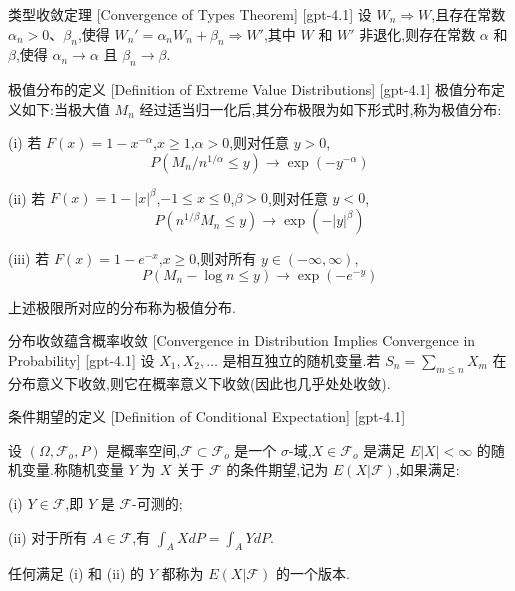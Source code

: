\documentclass[UTF8]{ctexart}
\begin{document}
    
    
    \begin{thm}
        {类型收敛定理}
        [Convergence of Types Theorem]
        [gpt-4.1]
        设 $W_n \Rightarrow W$,且存在常数 $\alpha_n > 0$、$\beta_n$,使得 $W_n' = \alpha_n W_n + \beta_n \Rightarrow W'$,其中 $W$ 和 $W'$ 非退化,则存在常数 $\alpha$ 和 $\beta$,使得 $\alpha_n \to \alpha$ 且 $\beta_n \to \beta$.
    \end{thm}
    
    
    
    \begin{dfn}
        {极值分布的定义}
        [Definition of Extreme Value Distributions]
        [gpt-4.1]
        极值分布定义如下:当极大值 $M_n$ 经过适当归一化后,其分布极限为如下形式时,称为极值分布:

(i) 若 $F(x) = 1 - x^{-\alpha}$,$x \ge 1$,$\alpha > 0$,则对任意 $y > 0$,
\[
P(M_n / n^{1/\alpha} \leq y) \to \exp(-y^{-\alpha})
\]

(ii) 若 $F(x) = 1 - |x|^{\beta}$,$-1 \leq x \leq 0$,$\beta > 0$,则对任意 $y < 0$,
\[
P(n^{1/\beta} M_n \leq y) \to \exp(-|y|^{\beta})
\]

(iii) 若 $F(x) = 1 - e^{-x}$,$x \ge 0$,则对所有 $y \in (-\infty, \infty)$,
\[
P(M_n - \log n \leq y) \to \exp(-e^{-y})
\]

上述极限所对应的分布称为极值分布.

    \end{dfn}
    
    
    
    \begin{thm}
        {分布收敛蕴含概率收敛}
        [Convergence in Distribution Implies Convergence in Probability]
        [gpt-4.1]
        设 $X_1, X_2, \dots$ 是相互独立的随机变量.若 $S_n = \sum_{m \leq n} X_m$ 在分布意义下收敛,则它在概率意义下收敛(因此也几乎处处收敛).
    \end{thm}
    
    
    
    \begin{dfn}
        {条件期望的定义}
        [Definition of Conditional Expectation]
        [gpt-4.1]
        
设 $(\Omega, \mathcal{F}_o, P)$ 是概率空间,$\mathcal{F} \subset \mathcal{F}_o$ 是一个 $\sigma$-域,$X \in \mathcal{F}_o$ 是满足 $E|X| < \infty$ 的随机变量.称随机变量 $Y$ 为 $X$ 关于 $\mathcal{F}$ 的条件期望,记为 $E(X | \mathcal{F})$,如果满足:

(i) $Y \in \mathcal{F}$,即 $Y$ 是 $\mathcal{F}$-可测的;

(ii) 对于所有 $A \in \mathcal{F}$,有 $\int_A X dP = \int_A Y dP$.

任何满足 (i) 和 (ii) 的 $Y$ 都称为 $E(X | \mathcal{F})$ 的一个版本.

    \end{dfn}
    
\end{document}

